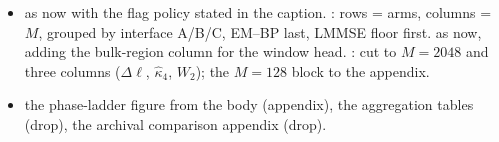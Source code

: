 \begin{itemize}
\item {} as now with the flag policy stated in the caption. : rows = arms, columns = $M$, grouped by interface A/B/C, EM--BP last, LMMSE floor first.  as now, adding the bulk-region column for the window head. : cut to $M=2048$ and three columns ($\Delta\ell$, $\hat\kappa_4$, $W_2$); the $M=128$ block to the appendix.
\item {} the phase-ladder figure from the body (appendix), the aggregation tables (drop), the archival comparison appendix (drop).
\end{itemize}
